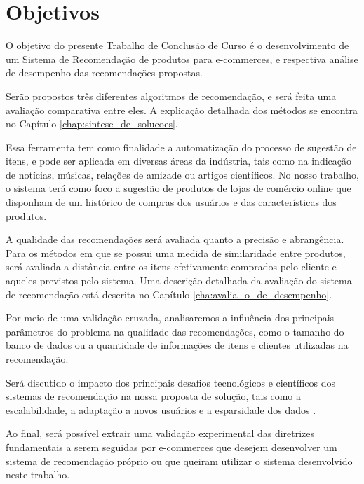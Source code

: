 \chapter[Objetivos]{Objetivos}
\label{chap:objetivos}

O objetivo do presente Trabalho de Conclusão de Curso é o desenvolvimento de um Sistema de Recomendação de produtos para e-commerces, e respectiva análise de desempenho das recomendações propostas. 

Serão propostos três diferentes algoritmos de recomendação, e será feita uma avaliação comparativa entre eles. A explicação detalhada dos métodos se encontra no Capítulo \ref{chap:sintese_de_solucoes}.

Essa ferramenta tem como finalidade a automatização do processo de sugestão de itens, e pode ser aplicada em diversas áreas da indústria, tais como na indicação de notícias, músicas, relações de amizade ou artigos científicos. No nosso trabalho, o sistema terá como foco a sugestão de produtos de lojas de comércio online que disponham de um histórico de compras dos usuários e das características dos produtos.

A qualidade das recomendações será avaliada quanto a precisão e abrangência. Para os métodos em que se possui uma medida de similaridade entre produtos, será avaliada a distância entre os itens efetivamente comprados pelo cliente e aqueles previstos pelo sistema. Uma descrição detalhada da avaliação do sistema de recomendação está descrita no Capítulo \ref{cha:avalia_o_de_desempenho}.

Por meio de uma validação cruzada, analisaremos a influência dos principais parâmetros do problema na qualidade das recomendações, como o tamanho do banco de dados ou a quantidade de informações de itens e clientes utilizadas na recomendação.

Será discutido o impacto dos principais desafios tecnológicos e científicos dos sistemas de recomendação na nossa proposta de solução, tais como a escalabilidade, a adaptação a novos usuários e a esparsidade dos dados \cite{sarwar2000analysis}.

Ao final, será possível extrair uma validação experimental das diretrizes fundamentais a serem seguidas por e-commerces que desejem desenvolver um sistema de recomendação próprio ou que queiram utilizar o sistema desenvolvido neste trabalho. 